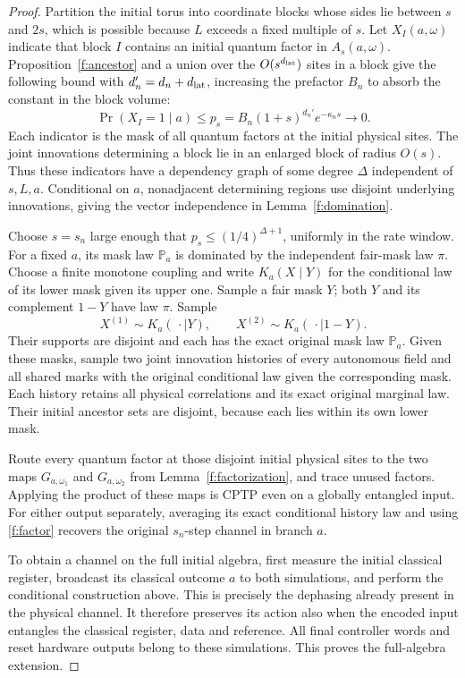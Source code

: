 \begin{proof}
Partition the initial torus into coordinate blocks whose sides lie
between \(s\) and \(2s\), which is possible because \(L\) exceeds a
fixed multiple of \(s\). Let \(X_I(a,\omega)\) indicate that block
\(I\) contains an initial quantum factor in \(A_s(a,\omega)\).
Proposition~\ref{f:ancestor} and a union over the \(O(s^{d_{\rm lat}})\) sites in a block give the following bound with \(d_n'=d_n+d_{\rm lat}\), increasing the prefactor \(B_n\) to absorb the constant in the block volume:
\[
 \Pr(X_I=1\mid a)\le
 p_s= B_n(1+s)^{d_n'}e^{-\kappa_ns}\longrightarrow0.
\]
Each indicator is the mask of all quantum factors at the initial physical sites.
The joint innovations determining a block lie in an enlarged block of
radius \(O(s)\). Thus these indicators have a dependency graph of
some degree \(\Delta\) independent of \(s,L,a\). Conditional on
\(a\), nonadjacent determining regions use disjoint underlying
innovations, giving the vector independence in
Lemma~\ref{f:domination}.

Choose \(s=s_n\) large enough that
\(p_s\le(1/4)^{\Delta+1}\), uniformly in the rate window. For a
fixed \(a\), its mask law \(\mathbb P_a\) is dominated by the independent
fair-mask law \(\pi\). Choose a finite monotone coupling and write
\(K_a(X\mid Y)\) for the conditional law of its lower mask given
its upper one. Sample a fair mask \(Y\); both \(Y\) and its
complement \(1-Y\) have law \(\pi\). Sample
\[
 X^{(1)}\sim K_a(\,\cdot\mid Y),\qquad
 X^{(2)}\sim K_a(\,\cdot\mid1-Y).
\]
Their supports are disjoint and each has the exact original mask
law \(\mathbb P_a\). Given these masks, sample two joint
innovation histories of every autonomous field and all shared marks with the original conditional law given the
corresponding mask. Each history retains all physical correlations and its exact original marginal
law. Their initial ancestor sets are disjoint, because each
lies within its own lower mask.

Route every quantum factor at those disjoint initial physical sites to the two maps
\(G_{a,\omega_1}\) and \(G_{a,\omega_2}\) from
Lemma~\ref{f:factorization}, and trace unused factors. Applying the
product of these maps is CPTP even on a globally entangled input.
For either output separately, averaging its exact conditional
history law and using \eqref{f:factor} recovers the original
\(s_n\)-step channel in branch \(a\).

To obtain a channel on the full initial algebra, first measure the
initial classical register, broadcast its classical outcome \(a\)
to both simulations, and perform the conditional construction above.
This is precisely the dephasing already present in the physical
channel. It therefore preserves its action also when the encoded
input entangles the classical register, data and reference.
All final controller words and reset hardware outputs belong to
these simulations. This proves the full-algebra extension.
\end{proof}

